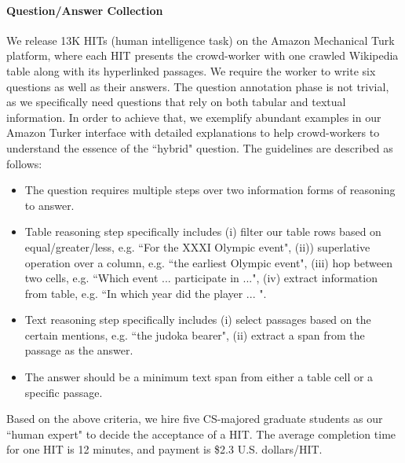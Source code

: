 \documentclass[11pt,a4paper]{article}
\begin{document}
\paragraph{Question/Answer Collection}
We release 13K HITs (human intelligence task) on the Amazon Mechanical Turk platform, where each HIT presents the crowd-worker with one crawled Wikipedia table along with its hyperlinked passages. We require the worker to write six questions as well as their answers. The question annotation phase is not trivial, as we specifically need questions that rely on both tabular and textual information. In order to achieve that, we exemplify abundant examples in our Amazon Turker interface with detailed explanations to help crowd-workers to understand the essence of the ``hybrid" question. The guidelines are described as follows:
\begin{itemize}
    \item The question requires multiple steps over two information forms of reasoning to answer.
    \item Table reasoning step specifically includes (i) filter our table rows based on equal/greater/less, e.g. ``For the XXXI Olympic event", (ii)) superlative operation over a column, e.g. ``the earliest Olympic event", (iii) hop between two cells, e.g. ``Which event ... participate in ...", (iv) extract information from table, e.g. ``In which year did the player ... ".
    \item Text reasoning step specifically includes (i) select passages based on the certain mentions, e.g. ``the judoka bearer", (ii) extract a span from the passage as the answer.
    \item The answer should be a minimum text span from either a table cell or a specific passage.
\end{itemize}
Based on the above criteria, we hire five CS-majored graduate students as our ``human expert" to decide the acceptance of a HIT. The average completion time for one HIT is 12 minutes, and payment is \$2.3 U.S. dollars/HIT. 
\end{document}

